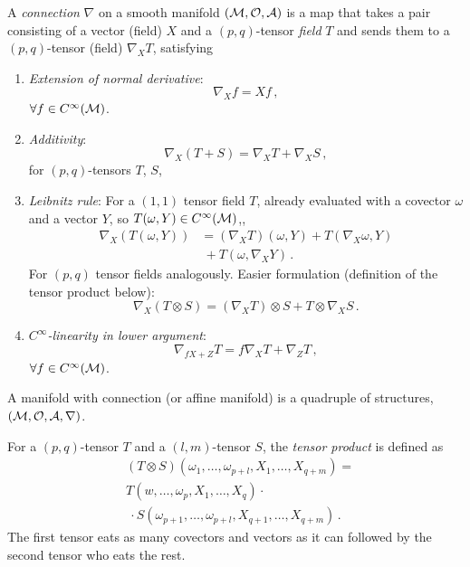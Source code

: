 \documentclass[11pt, a4paper, twocolumn]{article} %
\begin{document}
\begin{defn}
    A \textit{connection} $\nabla$ on a smooth manifold $(\mathcal{M},\mathcal{O}, \mathcal{A})$ is a map
    that takes a pair consisting of a vector (field) $X$ and a $(p,q)$-tensor \textit{field} $T$
    and sends them to a $(p,q)$-tensor (field) $\nabla_X T$,
    satisfying
    \begin{enumerate}
        \item \textit{Extension of normal derivative}:
            \begin{equation}
                \nabla_X f = Xf\,,
            \end{equation}
            $\forall f \in C^\infty(\mathcal{M})$.
        \item \textit{Additivity}: 
            \begin{equation}
                \nabla_X(T+S) = \nabla_X T + \nabla_X S\,,
            \end{equation}
            for $(p,q)$-tensors $T$, $S$,
        \item \textit{Leibnitz rule}: For a $(1,1)$ tensor field $T$, already evaluated with a covector $\omega$ and a vector $Y$,
            so $T(\omega, Y)\in C^\infty(\mathcal{M})$,,
            \begin{align}
                \nonumber \nabla_X\left( T(\omega, Y) \right) &= (\nabla_X T)(\omega, Y) + T(\nabla_X \omega, Y)\\
                &~+ T(\omega, \nabla_X Y)\,.
            \end{align}
            For $(p,q)$ tensor fields analogously.
            Easier formulation (definition of the tensor product below):
            \begin{equation}
                \nabla_X(T\otimes S) = (\nabla_X T) \otimes S + T \otimes \nabla_X S\,.
            \end{equation}
        \item \textit{$C^\infty$-linearity in lower argument}:
        \begin{equation}
            \nabla_{fX+Z}T = f\nabla_X T + \nabla_Z T\,,
        \end{equation}
        $\forall f \in C^\infty(\mathcal{M})$.
    \end{enumerate}
    A manifold with connection (or affine manifold) is a quadruple of structures, $(\mathcal{M}, \mathcal{O, A}, \nabla)$.
\end{defn}
\begin{defn}
    For a $(p,q)$-tensor $T$ and a $(l,m)$-tensor $S$, the \textit{tensor product} is defined as
    \begin{align}
        \nonumber&(T\otimes S)(\omega_1, \ldots, \omega_{p+l}, X_1,\ldots, X_{q+m}) = \\
        &T(w,\ldots, \omega_p, X_1, \ldots, X_q)\cdot\\ 
        \nonumber&~\cdot S(\omega_{p+1}, \ldots, \omega_{p+l}, X_{q+1},\ldots,X_{q+m})\,.
    \end{align}
    The first tensor eats as many covectors and vectors as it can followed by the second tensor who eats the rest.
\end{defn}
\end{document}
